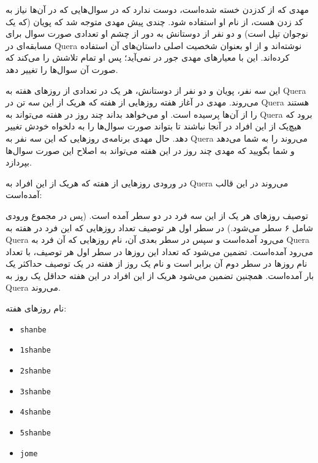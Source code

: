 \begin{problem}{}
{}{}
{}{}{}

    مهدی که از کدزدن خسته شده‌است، دوست ندارد که در سوال‌هایی که در آن‌ها نیاز به کد زدن هست، از نام او استفاده شود. چندی پیش مهدی متوجه شد که پویان (که یک نوجوان تپل است) و دو نفر از دوستانش به دور از چشم او تعدادی صورت سوال برای مسابقه‌ای در Quera نوشته‌اند و از او بعنوان شخصیت اصلی داستان‌های آن استفاده کرده‌اند. این با معیارهای مهدی جور در نمی‌آید؛ پس او تمام تلاشش را می‌کند که صورت آن سوال‌ها را تغییر دهد.

    این سه نفر، پویان و دو نفر از دوستانش، هر یک در تعدادی از روزهای هفته به Quera می‌روند. مهدی در آغاز هفته روزهایی از هفته که هریک از این سه تن در Quera هستند را از آن‌ها پرسیده است. او می‌خواهد بداند چند روز در هفته می‌تواند به Quera برود که هیچ‌یک از این افراد در آنجا نباشند تا بتواند صورت سوال‌ها را به دلخواه خودش تغییر دهد. حال مهدی برنامه‌ی روزهایی که این سه نفر به Quera می‌روند را به شما می‌دهد و شما بگویید که مهدی چند روز در این هفته می‌تواند به اصلاح این صورت سوال‌ها بپردازد.

    \Explanations
    در ورودی روز‌هایی از هفته که هریک از این افراد به Quera می‌روند در این قالب آمده‌است:

    توصیف روز‌های هر یک از این سه فرد در دو سطر آمده است. (پس در مجموع ورودی شامل ۶ سطر می‌شود.) در سطر اول هر توصیف تعداد روز‌هایی که این فرد در هفته به Quera می‌رود آمده‌است و سپس در سطر بعدی آن، نام روز‌هایی که آن فرد به Quera می‌رود آمده‌است. تضمین می‌شود که تعداد این روز‌ها در سطر اول هر توصیف، با تعداد نام روزها در سطر دوم آن برابر است و نام یک روز از هفته در یک توصیف حداکثر یک‌ بار آمده‌است. همچنین تضمین می‌شود هریک از این افراد در این هفته حداقل یک روز به Quera می‌روند.

    نام روز‌های هفته:
    \begin{itemize}
        \item \texttt{shanbe}
        \item \texttt{1shanbe}
        \item \texttt{2shanbe}
        \item \texttt{3shanbe}
        \item \texttt{4shanbe}
        \item \texttt{5shanbe}
        \item \texttt{jome}
    \end{itemize}


\end{problem}
